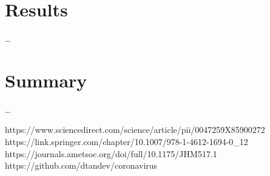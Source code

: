 \documentclass[conference]{IEEEtran}
\begin{document}
\section{Results}
\dots

\section{Summary}
\dots


\begin{thebibliography}{00}
 https://www.sciencedirect.com/science/article/pii/0047259X85900272
 https://link.springer.com/chapter/10.1007/978-1-4612-1694-0\_12
 https://journals.ametsoc.org/doi/full/10.1175/JHM517.1
 https://github.com/dtandev/coronavirus
\end{thebibliography}
\vspace{12pt}
\end{document}
